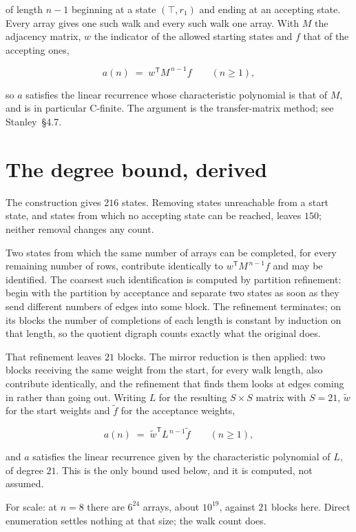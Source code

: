 \documentclass[11pt]{article}
\theoremstyle{definition}
\begin{document}
of length $n-1$ beginning at a state $(\top,r_1)$ and ending at an accepting state. Every array gives one such walk and every such walk one array. With $M$ the adjacency matrix, $w$ the indicator of the allowed starting states and $f$ that of the accepting ones,

\[a(n) \;=\; w^{\mathsf T} M^{\,n-1} f \qquad (n \ge 1),\]

so $a$ satisfies the linear recurrence whose characteristic polynomial is that of $M$, and is in particular C-finite. The argument is the transfer-matrix method; see Stanley~\S4.7.

\section{The degree bound, derived}

The construction gives $216$ states. Removing states unreachable from a start state, and states from which no accepting state can be reached, leaves $150$; neither removal changes any count.

Two states from which the same number of arrays can be completed, for every remaining number of rows, contribute identically to $w^{\mathsf T}M^{\,n-1}f$ and may be identified. The coarsest such identification is computed by partition refinement: begin with the partition by acceptance and separate two states as soon as they send different numbers of edges into some block. The refinement terminates; on its blocks the number of completions of each length is constant by induction on that length, so the quotient digraph counts exactly what the original does.

That refinement leaves $21$ blocks. The mirror reduction is then applied: two blocks receiving the same weight from the start, for every walk length, also contribute identically, and the refinement that finds them looks at edges coming in rather than going out. Writing $L$ for the resulting $S \times S$ matrix with $S = 21$, $\tilde w$ for the start weights and $\tilde f$ for the acceptance weights,

\[a(n) \;=\; \tilde w^{\mathsf T} L^{\,n-1} \tilde f \qquad (n \ge 1),\]

and $a$ satisfies the linear recurrence given by the characteristic polynomial of $L$, of degree $21$. This is the only bound used below, and it is computed, not assumed.

For scale: at $n = 8$ there are $6^{24}$ arrays, about $10^{19}$, against $21$ blocks here. Direct enumeration settles nothing at that size; the walk count does.
\end{document}
